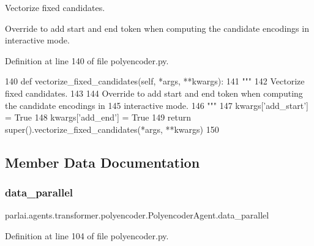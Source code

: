 \begin{DoxyVerb}Vectorize fixed candidates.

Override to add start and end token when computing the candidate encodings in
interactive mode.
\end{DoxyVerb}
 

Definition at line 140 of file polyencoder.\+py.


\begin{DoxyCode}
140     \textcolor{keyword}{def }vectorize\_fixed\_candidates(self, *args, **kwargs):
141         \textcolor{stringliteral}{"""}
142 \textcolor{stringliteral}{        Vectorize fixed candidates.}
143 \textcolor{stringliteral}{}
144 \textcolor{stringliteral}{        Override to add start and end token when computing the candidate encodings in}
145 \textcolor{stringliteral}{        interactive mode.}
146 \textcolor{stringliteral}{        """}
147         kwargs[\textcolor{stringliteral}{'add\_start'}] = \textcolor{keyword}{True}
148         kwargs[\textcolor{stringliteral}{'add\_end'}] = \textcolor{keyword}{True}
149         \textcolor{keywordflow}{return} super().vectorize\_fixed\_candidates(*args, **kwargs)
150 
\end{DoxyCode}


\subsection{Member Data Documentation}
\mbox{\label{classparlai_1_1agents_1_1transformer_1_1polyencoder_1_1PolyencoderAgent_a7b415240e04df392cb8767911fc0ff68}} 
\subsubsection{\texorpdfstring{data\+\_\+parallel}{data\_parallel}}
{\footnotesize\ttfamily parlai.\+agents.\+transformer.\+polyencoder.\+Polyencoder\+Agent.\+data\+\_\+parallel}



Definition at line 104 of file polyencoder.\+py.

